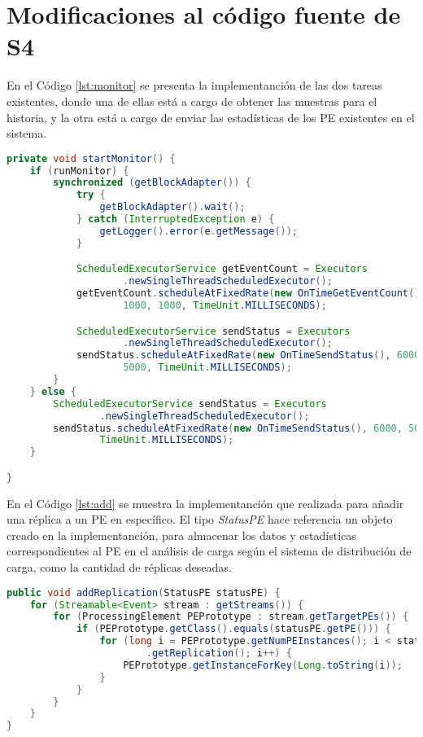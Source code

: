 \chapter{Modificaciones al código fuente de S4}
\label{apendice:codigoFuenteS4}

En el Código \ref{lst:monitor} se presenta la implementanción de las dos tareas existentes, donde una de ellas está a cargo de obtener las muestras para el historia, y la otra está a cargo de enviar las estadísticas de los PE existentes en el sistema.

\begin{lstlisting}[caption={Tareas que ejecutan el sistema de distribución de carga.},label={lst:monitor},language=Java]
private void startMonitor() {
	if (runMonitor) {
		synchronized (getBlockAdapter()) {
			try {
				getBlockAdapter().wait();
			} catch (InterruptedException e) {
				getLogger().error(e.getMessage());
			}

			ScheduledExecutorService getEventCount = Executors
					.newSingleThreadScheduledExecutor();
			getEventCount.scheduleAtFixedRate(new OnTimeGetEventCount(),
					1000, 1000, TimeUnit.MILLISECONDS);

			ScheduledExecutorService sendStatus = Executors
					.newSingleThreadScheduledExecutor();
			sendStatus.scheduleAtFixedRate(new OnTimeSendStatus(), 6000,
					5000, TimeUnit.MILLISECONDS);
		}
	} else {
		ScheduledExecutorService sendStatus = Executors
				.newSingleThreadScheduledExecutor();
		sendStatus.scheduleAtFixedRate(new OnTimeSendStatus(), 6000, 5000,
				TimeUnit.MILLISECONDS);
	}

}
\end{lstlisting}

En el Código \ref{lst:add} se muestra la implementanción que realizada para añadir una réplica a un PE en específico. El tipo \textit{StatusPE} hace referencia un objeto creado en la implementanción, para almacenar los datos y estadísticas correspondientes al PE en el análisis de carga según el sistema de distribución de carga, como la cantidad de réplicas deseadas.

\begin{lstlisting}[caption={Añadir r\'eplicas a un PE en S4.},label={lst:add},language=Java]
public void addReplication(StatusPE statusPE) {
	for (Streamable<Event> stream : getStreams()) {
		for (ProcessingElement PEPrototype : stream.getTargetPEs()) {
			if (PEPrototype.getClass().equals(statusPE.getPE())) {
				for (long i = PEPrototype.getNumPEInstances(); i < statusPE
						.getReplication(); i++) {
					PEPrototype.getInstanceForKey(Long.toString(i));
				}
			}
		}
	}
}
\end{lstlisting}

